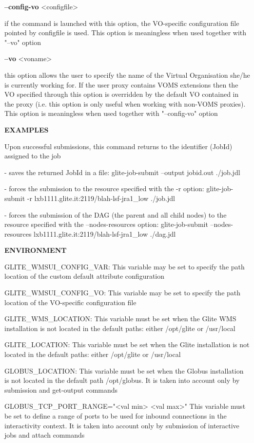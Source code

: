{\textbf{--config-vo} <configfile>

if the command is launched with this option, the VO-specific configuration file pointed by configfile is used. This option is meaningless when used together with "--vo" option

\textbf{--vo} <voname>

this option allows the user to specify the name of the Virtual Organisation she/he is currently working for.
If the user proxy contains VOMS extensions then the VO specified through this option is overridden by the default VO contained in the proxy (i.e. this option is only useful when working with non-VOMS proxies).
This option is meaningless when used together with "--config-vo" option


\medskip
\textbf{EXAMPLES}
\smallskip


Upon successful submissions, this command returns to the identifier (JobId) assigned to the job

- saves the returned JobId in a file:
glite-job-submit --output jobid.out ./job.jdl

- forces the submission to the resource specified with the -r option:
glite-job-submit -r lxb1111.glite.it:2119/blah-lsf-jra1\_low ./job.jdl

- forces the submission of the DAG (the parent and all child nodes) to the resource specified with the --nodes-resources option:
glite-job-submit --nodes-resources lxb1111.glite.it:2119/blah-lsf-jra1\_low ./dag.jdl

\medskip
\textbf{ENVIRONMENT}
\smallskip


GLITE\_WMSUI\_CONFIG\_VAR:  This variable may be set to specify the path location of the custom default attribute configuration

GLITE\_WMSUI\_CONFIG\_VO: This variable may be set to specify the path location of the VO-specific configuration file

GLITE\_WMS\_LOCATION:  This variable must be set when the Glite WMS installation is not located in the default paths: either /opt/glite or /usr/local

GLITE\_LOCATION: This variable must be set when the Glite installation is not located in the default paths: either /opt/glite or /usr/local


GLOBUS\_LOCATION: This variable must be set when the Globus installation is not located in the default path /opt/globus.
It is taken into account only by submission and get-output commands

GLOBUS\_TCP\_PORT\_RANGE="<val min> <val max>" This variable must be set to define a range of ports to be used for inbound connections in the interactivity context.
It is taken into account only by submission of interactive jobs and attach commands

}

